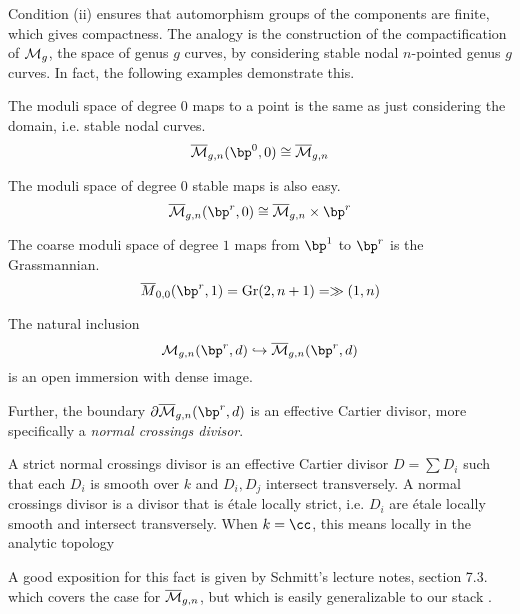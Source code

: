 \documentclass[12pt]{article}
\begin{document}
Condition (ii) ensures that automorphism groups of the components are finite, which gives compactness. The analogy is the construction of the compactification of $\mathcal{M}_g$, the space of genus $g$ curves, by considering stable nodal $n$-pointed genus $g$ curves. In fact, the following examples demonstrate this.

\begin{example} The moduli space of degree $0$ maps to a point is the same as just considering the domain, i.e. stable nodal curves.
  \[\overline{\calm}_{g,n}(\bp^0, 0) \cong \overline{\calm}_{g,n}\]
\end{example}

\begin{example}
  The moduli space of degree $0$ stable maps is also easy.
  \[\overline{\calm}_{g,n}(\bp^r,0) \cong \overline{\calm}_{g,n} \times \bp^r\]
\end{example}

\begin{example}
  The coarse moduli space of degree $1$ maps from $\bp^1$ to $\bp^r$ is the Grassmannian.
  \[\overline{M}_{0,0}(\bp^r, 1) = \Gr(2, n+1) = \gg(1,n)\]
\end{example}

\begin{prop}
  The natural inclusion
  \[\calm_{g,n}(\bp^r, d) \hookrightarrow \overline{\calm}_{g,n}(\bp^r,d)\]
  is an open immersion with dense image. 
  
  Further, the boundary $\partial \overline{\calm}_{g,n}(\bp^r,d)$ is an effective Cartier divisor, more specifically a \textit{normal crossings divisor}.
\end{prop}

\begin{rem}
  A strict normal crossings divisor is an effective Cartier divisor $D = \sum D_i$ such that each $D_i$ is smooth over $k$ and $D_i,D_j$ intersect transversely. A normal crossings divisor is a divisor that is \'etale locally strict, i.e. $D_i$ are \'etale locally smooth and intersect transversely. When $k = \cc$, this means locally in the analytic topology
\end{rem}

A good exposition for this fact is given by Schmitt's lecture notes, section 7.3. which covers the case for $\overline{\mathcal{M}}_{g,n}$, but which is easily generalizable to our stack \cite{S}.

\printbibliography
\end{document}
